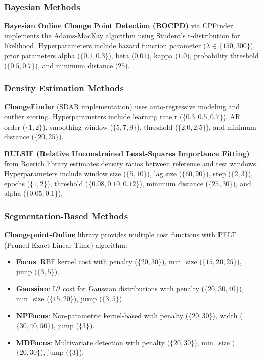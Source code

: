 \documentclass[journal,article,submit,pdftex,moreauthors]{Definitions/mdpi}
\begin{document}
\subsubsection{Bayesian Methods}

\textbf{Bayesian Online Change Point Detection (BOCPD)} via CPFinder implements the Adams-MacKay algorithm using Student's t-distribution for likelihood. Hyperparameters include hazard function parameter ($\lambda \in \{150, 300\}$), prior parameters alpha ($\{0.1, 0.3\}$), beta ($0.01$), kappa ($1.0$), probability threshold ($\{0.5, 0.7\}$), and minimum distance ($25$).

\subsubsection{Density Estimation Methods}

\textbf{ChangeFinder} (SDAR implementation) uses auto-regressive modeling and outlier scoring. Hyperparameters include learning rate r ($\{0.3, 0.5, 0.7\}$), AR order ($\{1, 2\}$), smoothing window ($\{5, 7, 9\}$), threshold ($\{2.0, 2.5\}$), and minimum distance ($\{20, 25\}$).

\textbf{RULSIF (Relative Unconstrained Least-Squares Importance Fitting)} from Roerich library estimates density ratios between reference and test windows. Hyperparameters include window size ($\{5, 10\}$), lag size ($\{60, 90\}$), step ($\{2, 3\}$), epochs ($\{1, 2\}$), threshold ($\{0.08, 0.10, 0.12\}$), minimum distance ($\{25, 30\}$), and alpha ($\{0.05, 0.1\}$).

\subsubsection{Segmentation-Based Methods}

\textbf{Changepoint-Online} library provides multiple cost functions with PELT (Pruned Exact Linear Time) algorithm:
\begin{itemize}
    \item \textbf{Focus}: RBF kernel cost with penalty ($\{20, 30\}$), min\_size ($\{15, 20, 25\}$), jump ($\{3, 5\}$).
    \item \textbf{Gaussian}: L2 cost for Gaussian distributions with penalty ($\{20, 30, 40\}$), min\_size ($\{15, 20\}$), jump ($\{3, 5\}$).
    \item \textbf{NPFocus}: Non-parametric kernel-based with penalty ($\{20, 30\}$), width ($\{30, 40, 50\}$), jump ($\{3\}$).
    \item \textbf{MDFocus}: Multivariate detection with penalty ($\{20, 30\}$), min\_size ($\{20, 30\}$), jump ($\{3\}$).
\end{itemize}
\end{document}
